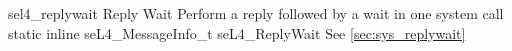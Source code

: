 %
%
%
%

\apidoc
{sel4_replywait}
{Reply Wait}
{Perform a reply followed by a wait in one system call}
{static inline seL4\_MessageInfo\_t seL4\_ReplyWait}
{
}
{\messageinforetdesc}
{See \autoref{sec:sys_replywait}}
